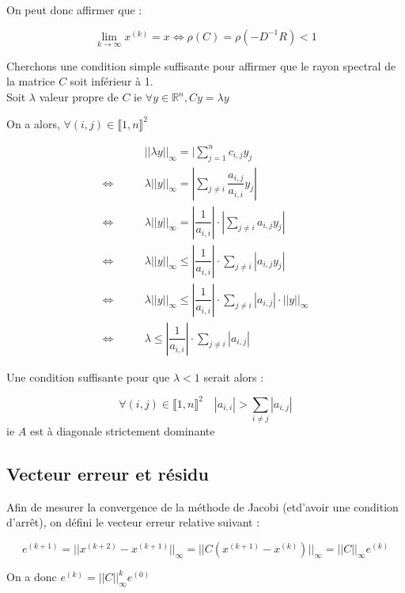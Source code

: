 \documentclass[11pt, a4paper]{article}
\begin{document}
On peut donc affirmer que :

\[
\lim_{k \to \infty}x^{(k)} = x \Leftrightarrow \rho(C) = \rho(-D^{-1}R) < 1
\]

\newpage 

Cherchons une condition simple suffisante pour affirmer que le rayon spectral de la matrice $C$ soit inférieur à 1.\\

Soit $\lambda$ valeur propre de $C$ ie $\forall y \in \mathbb{R}^n, Cy = \lambda y$

On a alors, $\forall (i,j) \in \llbracket 1,n \rrbracket^2$

\begin{align*}
    &||\lambda y||_{\infty} = |\sum_{j=1}^{n}c_{i,j}y_j\\
    \Leftrightarrow \qquad & \lambda||y||_{\infty} = |\sum_{j \neq i}\dfrac{a_{i,j}}{a_{i,i}}y_j|\\
    \Leftrightarrow \qquad & \lambda||y||_{\infty} = |\dfrac{1}{a_{i,i}}| \cdot |\sum_{j \neq i}a_{i,j}y_j|\\
    \Leftrightarrow \qquad & \lambda||y||_{\infty} \leq |\dfrac{1}{a_{i,i}}| \cdot \sum_{j \neq i}|a_{i,j}y_j|\\
    \Leftrightarrow \qquad & \lambda||y||_{\infty} \leq |\dfrac{1}{a_{i,i}}| \cdot \sum_{j \neq i}|a_{i,j}| \cdot ||y||_{\infty}\\
    \Leftrightarrow \qquad & \lambda \leq |\dfrac{1}{a_{i,i}}| \cdot \sum_{j \neq i}|a_{i,j}|
\end{align*}

Une condition suffisante pour que $\lambda < 1$ serait alors :

\[
\forall (i,j) \in \llbracket 1,n \rrbracket^2 \quad |a_{i,i}| > \sum_{i \neq j}|a_{i,j}|
\]
ie $A$ est à diagonale strictement dominante

\newpage 

\subsection{Vecteur erreur et résidu}

Afin de mesurer la convergence de la méthode de Jacobi (etd'avoir une condition d'arr\^et), on défini le vecteur erreur relative suivant :

\[
e^{(k+1)} = ||x^{(k+2)} - x^{(k+1)}||_{\infty} = ||C(x^{(k+1)} - x^{(k)})||_{\infty} = ||C||_{\infty}e^{(k)}
\]

On a donc $e^{(k)} = ||C||_{\infty}^ke^{(0)}$
\end{document}
